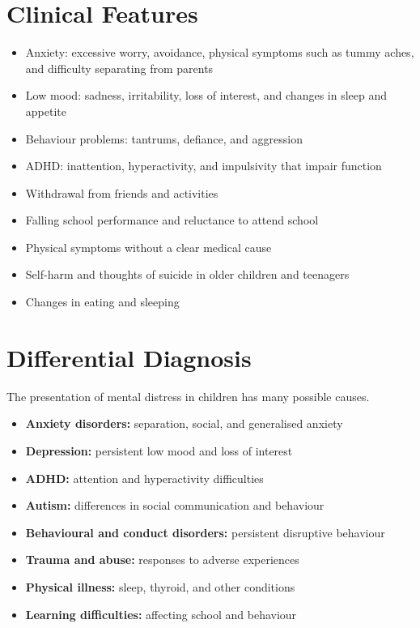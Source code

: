 \section*{Clinical Features}
\begin{itemize}
    \item Anxiety: excessive worry, avoidance, physical symptoms such as tummy aches, and difficulty separating from parents
    \item Low mood: sadness, irritability, loss of interest, and changes in sleep and appetite
    \item Behaviour problems: tantrums, defiance, and aggression
    \item ADHD: inattention, hyperactivity, and impulsivity that impair function
    \item Withdrawal from friends and activities
    \item Falling school performance and reluctance to attend school
    \item Physical symptoms without a clear medical cause
    \item Self-harm and thoughts of suicide in older children and teenagers
    \item Changes in eating and sleeping
\end{itemize}

\section*{Differential Diagnosis}
The presentation of mental distress in children has many possible causes.
\begin{itemize}
    \item \textbf{Anxiety disorders:} separation, social, and generalised anxiety
    \item \textbf{Depression:} persistent low mood and loss of interest
    \item \textbf{ADHD:} attention and hyperactivity difficulties
    \item \textbf{Autism:} differences in social communication and behaviour
    \item \textbf{Behavioural and conduct disorders:} persistent disruptive behaviour
    \item \textbf{Trauma and abuse:} responses to adverse experiences
    \item \textbf{Physical illness:} sleep, thyroid, and other conditions
    \item \textbf{Learning difficulties:} affecting school and behaviour
\end{itemize}

